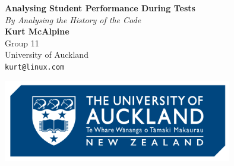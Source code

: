 \documentclass[a1,portrait]{a0poster}
\begin{document}
\begin{minipage}[b]{0.75\textwidth}
\Huge \color{NavyBlue} \textbf{Analysing Student Performance During Tests} \color{Black}\\ %
\huge\textit{By Analysing the History of the Code}\\[2cm] %
\Large \textbf{Kurt McAlpine}\\[0.5cm] %
\Large Group 11\\[0.4cm]
\Large University of Auckland\\[0.4cm] %
\large \texttt{kurt@linux.com}\\
\end{minipage}
%
\begin{minipage}[b]{0.25\textwidth}
\includegraphics[width=10cm]{logo.png}\\
\end{minipage}

\vspace{1cm} %
\end{document}
